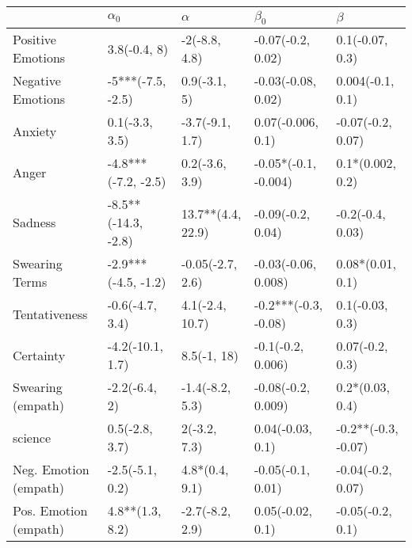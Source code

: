 \begin{tabular}{lllll}
\toprule
{} &           $\alpha_0$ &           $\alpha$ &             $\beta_0$ &              $\beta$ \\
\midrule
Positive Emotions     &         3.8(-0.4, 8) &      -2(-8.8, 4.8) &     -0.07(-0.2, 0.02) &      0.1(-0.07, 0.3) \\
Negative Emotions     &    -5***(-7.5, -2.5) &       0.9(-3.1, 5) &    -0.03(-0.08, 0.02) &     0.004(-0.1, 0.1) \\
Anxiety               &       0.1(-3.3, 3.5) &    -3.7(-9.1, 1.7) &     0.07(-0.006, 0.1) &    -0.07(-0.2, 0.07) \\
Anger                 &  -4.8***(-7.2, -2.5) &     0.2(-3.6, 3.9) &  -0.05*(-0.1, -0.004) &     0.1*(0.002, 0.2) \\
Sadness               &  -8.5**(-14.3, -2.8) &  13.7**(4.4, 22.9) &     -0.09(-0.2, 0.04) &     -0.2(-0.4, 0.03) \\
Swearing Terms        &  -2.9***(-4.5, -1.2) &   -0.05(-2.7, 2.6) &   -0.03(-0.06, 0.008) &     0.08*(0.01, 0.1) \\
Tentativeness         &      -0.6(-4.7, 3.4) &    4.1(-2.4, 10.7) &  -0.2***(-0.3, -0.08) &      0.1(-0.03, 0.3) \\
Certainty             &     -4.2(-10.1, 1.7) &        8.5(-1, 18) &     -0.1(-0.2, 0.006) &      0.07(-0.2, 0.3) \\
Swearing (empath)     &        -2.2(-6.4, 2) &    -1.4(-8.2, 5.3) &    -0.08(-0.2, 0.009) &      0.2*(0.03, 0.4) \\
science               &       0.5(-2.8, 3.7) &       2(-3.2, 7.3) &      0.04(-0.03, 0.1) &  -0.2**(-0.3, -0.07) \\
Neg. Emotion (empath) &      -2.5(-5.1, 0.2) &     4.8*(0.4, 9.1) &     -0.05(-0.1, 0.01) &    -0.04(-0.2, 0.07) \\
Pos. Emotion (empath) &      4.8**(1.3, 8.2) &    -2.7(-8.2, 2.9) &      0.05(-0.02, 0.1) &     -0.05(-0.2, 0.1) \\
\bottomrule
\end{tabular}

